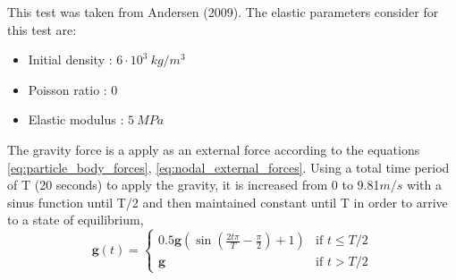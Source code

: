 This test was taken from Andersen (2009)\cite{thesis_Andersen_2009}. The
elastic parameters consider for this test are: 
\begin{itemize} 
\item  Initial density : $6\cdot 10^3\ kg/m^3$
\item  Poisson ratio : $0$
\item  Elastic modulus : $5\ MPa$
\end{itemize}
The gravity force is a apply as an external force according to the
equations \eqref{eq:particle_body_forces},
\eqref{eq:nodal_external_forces}. Using a total time period of T (20
seconds) to apply the gravity, it is increased from 0 to 9.81$m/s$
with a sinus function until T/2 and then maintained constant until T
in order to arrive to a state of equilibrium, 
\begin{equation}
  \label{eq:gravity-load-block}
 \mathbf{g}(t) = \left\{
    \begin{array}{ll}
      0.5 \mathbf{g} (\sin(\frac{2t \pi}{T} - \frac{\pi}{2})+1)  & \mbox{if } t \leq T/2 \\
      \mathbf{g} & \mbox{if } t > T/2
    \end{array}
  \right.
\end{equation}

